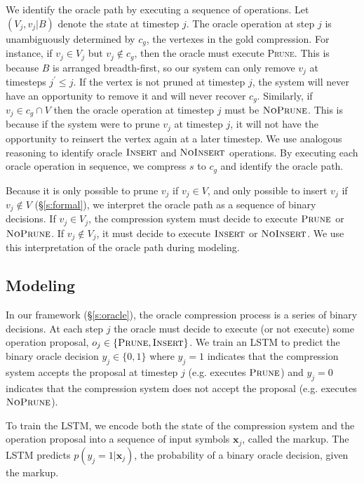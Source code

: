 \documentclass[11pt,a4paper]{article}
\begin{document}
We identify the oracle path by executing  a sequence of operations. Let $(V_j, v_j | B)$ denote the state at timestep $j$. The oracle operation at step $j$ is unambiguously determined by $c_g$, the vertexes in the gold compression. For instance, if $v_j \in V_j$ but $v_j \notin c_g$, then the oracle must execute \textsc{Prune}. This is because $B$ is arranged breadth-first, so our system can only remove $v_j$ at timesteps $j^{\prime} \leq j$. If the vertex is not pruned at timestep $j$, the system will never have an opportunity to remove it and will never recover $c_g$. Similarly, if $v_j \in c_g \cap V$ then the oracle operation at timestep $j$ must be $\textsc{NoPrune}$. This is because if the system were to prune $v_j$ at timestep $j$, it will not have the opportunity to reinsert the vertex again at a later timestep. We use analogous reasoning to identify oracle $\textsc{Insert}$ and $\textsc{NoInsert}$ operations. By executing each oracle operation in sequence, we compress $s$ to $c_g$ and identify the oracle path.

Because it is only possible to prune $v_j$ if $v_j \in V$, and only possible to insert $v_j$ if $v_j \notin V$ (\S\ref{s:formal}), we interpret the oracle path as a sequence of binary decisions. If $v_j \in V_j$, the compression system must decide to execute $\textsc{Prune}$ or $\textsc{NoPrune}$. If $v_j \notin V_j$, it must decide to execute $\textsc{Insert}$ or $\textsc{NoInsert}$. We use this interpretation of the oracle path during modeling.

\subsection{Modeling}\label{s:modeling}

In our framework (\S\ref{s:oracle}), the oracle compression process is a series of binary decisions. At each step $j$ the oracle must decide to execute (or not execute) some operation proposal, $o_j \in \{\textsc{Prune}, \textsc{Insert}\}$. We train an LSTM \cite{Hochreiter1997LongSM} to predict the binary oracle decision $y_j \in \{0,1\}$ where $y_j=1$ indicates that the compression system accepts the proposal at timestep $j$ (e.g. executes $\textsc{Prune}$) and $y_j=0$ indicates that the compression system does not accept the proposal (e.g. executes $\textsc{NoPrune}$).

To train the LSTM, we encode both the state of the compression system and the operation proposal into a sequence of input symbols $\bm{x}_j$, called the markup. The LSTM predicts $p(y_j=1 | \bm{x}_j)$, the probability of a binary oracle decision, given the markup. 
\end{document}
